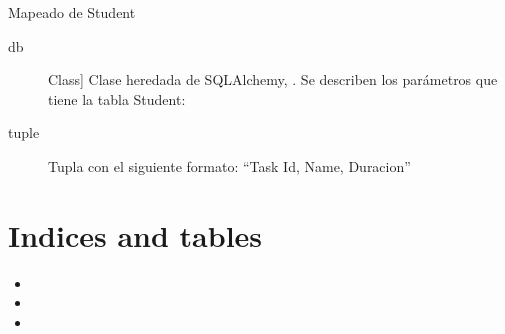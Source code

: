 \documentclass[a4paper,10pt,english]{sphinxmanual}
\begin{document}
\begin{fulllineitems}
\label{\detokenize{index:api3.student_api.models.Student.Student}}
\sphinxAtStartPar
Mapeado de Student
\begin{description}
\item[{db}] \leavevmode{[}Class{]}
\sphinxAtStartPar
Clase heredada de SQLAlchemy, .
Se describen los parámetros que tiene la tabla Student:
\begin{quote}

\end{quote}

\end{description}
\begin{description}
\item[{tuple}] \leavevmode
\sphinxAtStartPar
Tupla con el siguiente formato: “Task Id, Name, Duracion”

\end{description}

\end{fulllineitems}



\chapter{Indices and tables}
\label{\detokenize{index:indices-and-tables}}\begin{itemize}
\item {} 
\sphinxAtStartPar
{}

\item {} 
\sphinxAtStartPar
{}

\item {} 
\sphinxAtStartPar
{}

\end{itemize}
\end{document}
